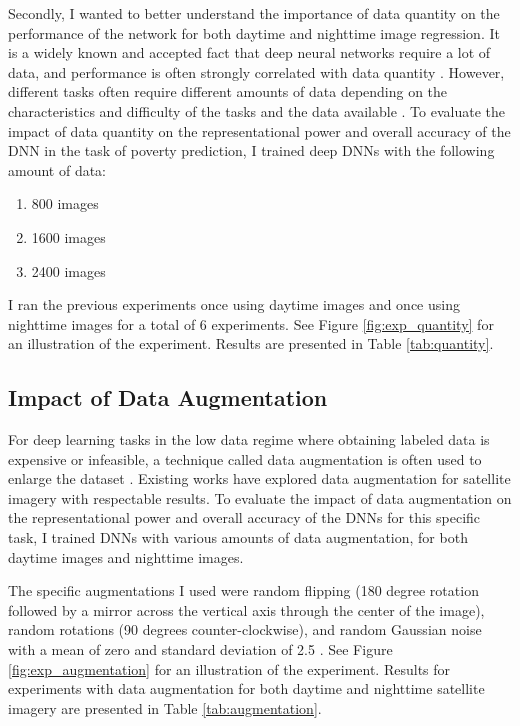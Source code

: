\documentclass{article}
\begin{document}
Secondly, I wanted to better understand the importance of data quantity on the performance of the network for both daytime and nighttime image regression. It is a widely known and accepted fact that deep neural networks require a lot of data, and performance is often strongly correlated with data quantity \cite{data}. However, different tasks often require different amounts of data depending on the characteristics and difficulty of the tasks and the data available \cite{data2}. To evaluate the impact of data quantity on the representational power and overall accuracy of the DNN in the task of poverty prediction, I trained deep DNNs with the following amount of data:

\begin{enumerate}

    \item 800 images
    \item 1600 images
    \item 2400 images

\end{enumerate}

I ran the previous experiments once using daytime images and once using nighttime images for a total of 6 experiments. See Figure \ref{fig:exp_quantity} for an illustration of the experiment. Results are presented in Table \ref{tab:quantity}.

\subsection{Impact of Data Augmentation}

For deep learning tasks in the low data regime where obtaining labeled data is expensive or infeasible, a technique called data augmentation is often used to enlarge the dataset \cite{aug}. Existing works have explored data augmentation for satellite imagery \cite{sat-aug} with respectable results. To evaluate the impact of data augmentation on the representational power and overall accuracy of the DNNs for this specific task, I trained DNNs with various amounts of data augmentation, for both daytime images and nighttime images. 

The specific augmentations I used were random flipping (180 degree rotation followed by a mirror across the vertical axis through the center of the image), random rotations (90 degrees counter-clockwise), and random Gaussian noise with a mean of zero and standard deviation of 2.5 \cite{noise}. See Figure \ref{fig:exp_augmentation} for an illustration of the experiment. Results for experiments with data augmentation for both daytime and nighttime satellite imagery are presented in Table \ref{tab:augmentation}.
\end{document}
